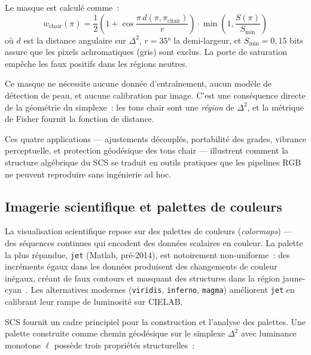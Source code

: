 \documentclass[12pt,a4paper]{article}
\begin{document}
Le masque est calcul\'e comme~:
\[
  w_\mathrm{chair}(\pi) = \frac{1}{2}\left(1 + \cos\frac{\pi\, d(\pi, \pi_\mathrm{chair})}{r}\right) \cdot \min\!\left(1, \frac{S(\pi)}{S_\mathrm{min}}\right)
\]
o\`u $d$ est la distance angulaire sur $\Delta^2$, $r = 35°$ la
demi-largeur, et $S_\mathrm{min} = 0{,}15$ bits assure que les pixels
achromatiques (gris) sont exclus. La porte de saturation emp\^eche les
faux positifs dans les r\'egions neutres.

Ce masque ne n\'ecessite aucune donn\'ee d'entra\^inement, aucun
mod\`ele de d\'etection de peau, et aucune calibration par image.
C'est une cons\'equence directe de la g\'eom\'etrie du simplexe~: les
tons chair sont une \emph{r\'egion} de $\Delta^2$, et la m\'etrique de
Fisher fournit la fonction de distance.

\medskip

Ces quatre applications --- ajustements d\'ecoupl\'es, portabilit\'e
des grades, vibrance perceptuelle, et protection g\'eod\'esique des
tons chair --- illustrent comment la structure alg\'ebrique du SCS se
traduit en outils pratiques que les pipelines RGB ne peuvent reproduire
sans ing\'enierie ad hoc.

\subsection{Imagerie scientifique et palettes de couleurs}

La visualisation scientifique repose sur des palettes de couleurs
(\emph{colormaps}) --- des s\'equences continues qui encodent des
donn\'ees scalaires en couleur. La palette la plus r\'epandue,
\texttt{jet} (Matlab, pr\'e-2014), est notoirement non-uniforme~: des
incr\'ements \'egaux dans les donn\'ees produisent des changements de
couleur in\'egaux, cr\'eant de faux contours et masquant des
structures dans la r\'egion jaune-cyan~\cite{borland2007}. Les
alternatives modernes (\texttt{viridis}, \texttt{inferno},
\texttt{magma}) am\'eliorent \texttt{jet} en calibrant leur rampe de
luminosit\'e sur CIELAB.

SCS fournit un cadre principiel pour la construction et l'analyse des
palettes. Une palette construite comme chemin g\'eod\'esique sur le
simplexe $\Delta^2$ avec luminance monotone $\ell$ poss\`ede trois
propri\'et\'es structurelles~:
\end{document}
